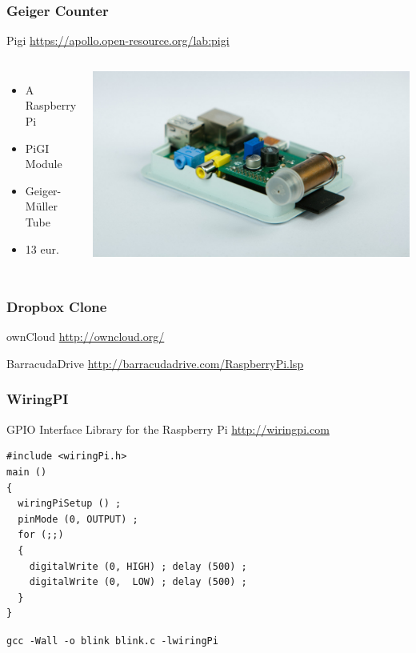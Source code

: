 \documentclass[10pt,colorlinks]{beamer}
\begin{document}
\begin{frame}[fragile]\frametitle{Geiger Counter}
\begin{block}{Pigi}
 \href{https://apollo.open-resource.org/lab:pigi}{https://apollo.open-resource.org/lab:pigi}
\end{block}
\begin{columns}[c]
\begin{itemize}
    \item     A Raspberry Pi
    \item PiGI Module
    \item Geiger-Müller Tube
    \item 13 eur.
\end{itemize}
\includegraphics[width=\textwidth]{figs/geiger}
\end{columns}
\end{frame}


\begin{frame}[fragile]\frametitle{Dropbox Clone}
\begin{block}{ownCloud}
\href{http://owncloud.org/}{http://owncloud.org/}
\end{block}
\begin{block}{BarracudaDrive}
\href{http://barracudadrive.com/RaspberryPi.lsp}{http://barracudadrive.com/RaspberryPi.lsp}
\end{block}

\end{frame}


\begin{frame}[fragile]\frametitle{WiringPI}
\begin{block}{GPIO Interface Library for the Raspberry Pi}
\href{http://wiringpi.com}{http://wiringpi.com}
\end{block}
\begin{verbatim}
#include <wiringPi.h>
main ()
{
  wiringPiSetup () ;
  pinMode (0, OUTPUT) ;
  for (;;)
  {
    digitalWrite (0, HIGH) ; delay (500) ;
    digitalWrite (0,  LOW) ; delay (500) ;
  }
}
\end{verbatim}
\verb|gcc -Wall -o blink blink.c -lwiringPi|
\end{frame}
\end{document}
